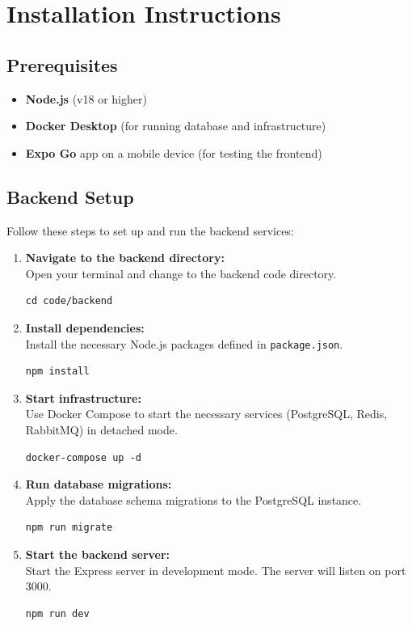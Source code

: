 \section{Installation Instructions}
\label{sec:installation_instructions}

\subsection{Prerequisites}
\begin{itemize}
    \item \textbf{Node.js} (v18 or higher)
    \item \textbf{Docker Desktop} (for running database and infrastructure)
    \item \textbf{Expo Go} app on a mobile device (for testing the frontend)
\end{itemize}

\subsection{Backend Setup}
Follow these steps to set up and run the backend services:

\begin{enumerate}
    \item \textbf{Navigate to the backend directory:} \\
    Open your terminal and change to the backend code directory.
    \begin{verbatim}
cd code/backend
    \end{verbatim}

    \item \textbf{Install dependencies:} \\
    Install the necessary Node.js packages defined in \texttt{package.json}.
    \begin{verbatim}
npm install
    \end{verbatim}

    \item \textbf{Start infrastructure:} \\
    Use Docker Compose to start the necessary services (PostgreSQL, Redis, RabbitMQ) in detached mode.
    \begin{verbatim}
docker-compose up -d
    \end{verbatim}

    \item \textbf{Run database migrations:} \\
    Apply the database schema migrations to the PostgreSQL instance.
    \begin{verbatim}
npm run migrate
    \end{verbatim}

    \item \textbf{Start the backend server:} \\
    Start the Express server in development mode. The server will listen on port 3000.
    \begin{verbatim}
npm run dev
    \end{verbatim}
\end{enumerate}

